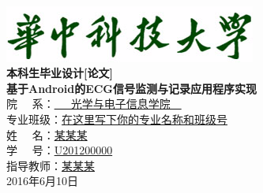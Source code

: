 \begin{titlepage}
\begin{center}
~~\\ 
\vspace{2.6cm}
\includegraphics[scale=1.3]{univ-title.png}
\\
\xiaochuhao
\vspace{1.3cm}
\zhongsong \textbf{本科生毕业设计[论文]\\}
\vspace{2cm}
\erhao
\heiti \textbf{基于Android的ECG信号监测与记录应用程序实现\\}
\vspace{2cm}
\fontsize{15.75pt}{48pt}\selectfont 
\zhongsong
院 \quad ~~系：\underline{\quad \quad ~~~光学与电子信息学院~~ \quad \quad}\\
专业班级：\underline{在这里写下你的专业名称和班级号} \\ 
姓 \quad ~~名：\underline{\phantom{aaaaaaaaaaaaa}某某某\phantom{aaaaaaaaaaaaa}} \\ 
学 \quad ~~号：\underline{\phantom{aaaaaaaaaaa}U201200000\phantom{aaaaaaaaaaa}} \\ 
指导教师：\underline{\phantom{aaaaaaaaaaaaa}某某某\phantom{aaaaaaaaaaaaa}} \\  
\vspace{1cm}
2016年6月10日\\
\end{center}
\end{titlepage}
